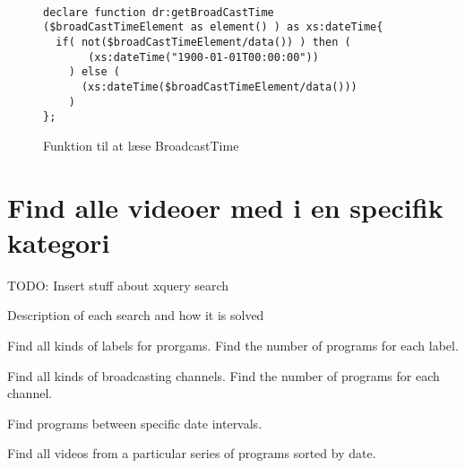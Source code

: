 \begin{figure}[ht]
\begin{lstlisting}[style=FAKE_XQUERY, language=XQUERY]

declare function dr:getBroadCastTime
($broadCastTimeElement as element() ) as xs:dateTime{
  if( not($broadCastTimeElement/data()) ) then (
       (xs:dateTime("1900-01-01T00:00:00"))
    ) else (
      (xs:dateTime($broadCastTimeElement/data()))
    ) 
};

\end{lstlisting}
\caption{Funktion til at læse BroadcastTime}
\label{xquerySearch:getBroadCastTime}
\end{figure}



\section{Find alle videoer med i en specifik kategori}


TODO: Insert stuff about xquery search

Description of each search and how it is solved

Find all kinds of labels for prorgams.
Find the number of programs for each label.

Find all kinds of broadcasting channels.
Find the number of programs for each channel.

Find programs between specific date intervals.

Find all videos from a particular series of programs sorted by date.

